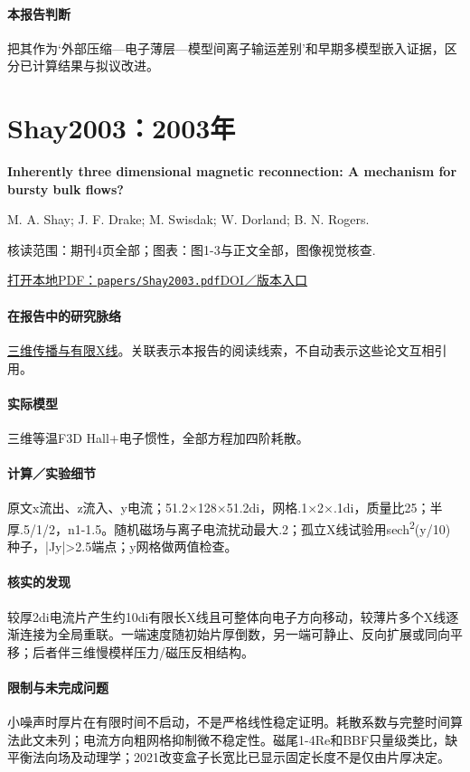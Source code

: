 \documentclass[UTF8,a4paper,11pt,openany,fontset=fandol]{ctexbook}
\begin{document}
\paragraph{本报告判断}把其作为‘外部压缩—电子薄层—模型间离子输运差别’和早期多模型嵌入证据，区分已计算结果与拟议改进。

\section{Shay2003：2003年}\label{paper:Shay2003}

\textbf{Inherently three dimensional magnetic reconnection: A mechanism for bursty bulk flows?}\citep{Shay2003}\

M. A. Shay;  J. F. Drake;  M. Swisdak;  W. Dorland;  B. N. Rogers.

\textsf{核读范围：}期刊4页全部；\textsf{图表：}图1-3与正文全部，图像视觉核查.

\href{run:../papers/Shay2003.pdf}{打开本地PDF：\texttt{papers/Shay2003.pdf}}\quad\href{https://doi.org/10.1029/2002gl016267}{DOI／版本入口}

\paragraph{在报告中的研究脉络}\hyperref[story:three]{三维传播与有限X线}。关联表示本报告的阅读线索，不自动表示这些论文互相引用。

\paragraph{实际模型}三维等温F3D Hall+电子惯性，全部方程加四阶耗散。

\paragraph{计算／实验细节}原文x流出、z流入、y电流；51.2×128×51.2di，网格.1×2×.1di，质量比25；半厚.5/1/2，n1-1.5。随机磁场与离子电流扰动最大.2；孤立X线试验用sech\textsuperscript{2}(y/10)种子，|Jy|>2.5端点；y网格做两值检查。

\paragraph{核实的发现}较厚2di电流片产生约10di有限长X线且可整体向电子方向移动，较薄片多个X线逐渐连接为全局重联。一端速度随初始片厚倒数，另一端可静止、反向扩展或同向平移；后者伴三维慢模样压力/磁压反相结构。

\paragraph{限制与未完成问题}小噪声时厚片在有限时间不启动，不是严格线性稳定证明。耗散系数与完整时间算法此文未列；电流方向粗网格抑制微不稳定性。磁尾1-4Re和BBF只量级类比，缺平衡法向场及动理学；2021改变盒子长宽比已显示固定长度不是仅由片厚决定。
\end{document}

